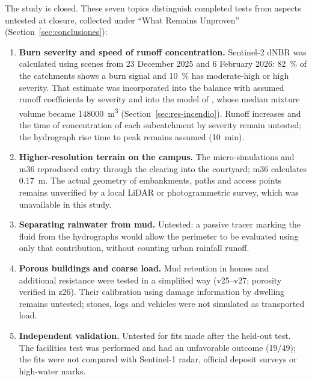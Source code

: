 The study is closed. These seven topics distinguish completed tests from aspects untested at closure, collected under ``What Remains Unproven'' (Section~\ref{sec:conclusiones}):
\begin{enumerate}
\item \textbf{Burn severity and speed of runoff concentration.} Sentinel-2 dNBR was calculated using scenes from 23 December 2025 and 6 February 2026: \SI{82}{\percent} of the catchments shows a burn signal and \SI{10}{\percent} has moderate-high or high severity. That estimate was incorporated into the balance with assumed runoff coefficients by severity and into the model of \citet{gartner2014}, whose median mixture volume became \SI{148000}{m^3} (Section~\ref{sec:res-incendio}). Runoff increases and the time of concentration of each subcatchment by severity remain untested; the hydrograph rise time to peak remains assumed (\SI{10}{min}).
\item \textbf{Higher-resolution terrain on the campus.} The micro-simulations and m36 reproduced entry through the clearing into the courtyard; m36 calculates \SI{0.17}{m}. The actual geometry of embankments, paths and access points remains unverified by a local LiDAR or photogrammetric survey, which was unavailable in this study.
\item \textbf{Separating rainwater from mud.} Untested: a passive tracer marking the fluid from the hydrographs would allow the perimeter to be evaluated using only that contribution, without counting urban rainfall runoff.
\item \textbf{Porous buildings and coarse load.} Mud retention in homes and additional resistance were tested in a simplified way (v25--v27; porosity verified in z26). Their calibration using damage information by dwelling remains untested; stones, logs and vehicles were not simulated as transported load.
\item \textbf{Independent validation.} Untested for fits made after the held-out test. The facilities test was performed and had an unfavorable outcome (19/49); the fits were not compared with Sentinel-1 radar, official deposit surveys or high-water marks.

\end{enumerate}
